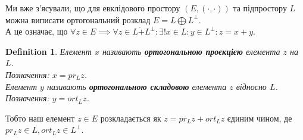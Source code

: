 \documentclass[a4paper, 10pt]{article}
\theoremstyle{theoremdd}
\newtheorem{definition}[theorem]{Definition}
\begin{document}
Ми вже з'ясували, що для евклідового простору $(E,(\cdot,\cdot))$ та підпростору $L$ можна виписати ортогональний розклад $E = L \bigoplus L^\perp$.\\
А це означає, що $\forall z \in E \implies \forall z \in L \dot{+} L^\perp: \exists! x \in L: y \in L^\perp: z = x+y$.

\begin{definition}
Елемент $x$ називають \textbf{ортогональною проєкцією} елемента $z$ на $L$.\\
Позначення: $x = pr_L z$.\\
Елемент $y$ називають \textbf{ортогональною складовою} елемента $z$ відносно $L$.\\
Позначення: $y = ort_L z$.
\end{definition}

Тобто наш елемент $z \in E$ розкладається як $z = pr_L z + ort_L z$ єдиним чином, де $pr_L z \in L, ort_L z \in L^\perp$.
\end{document}

